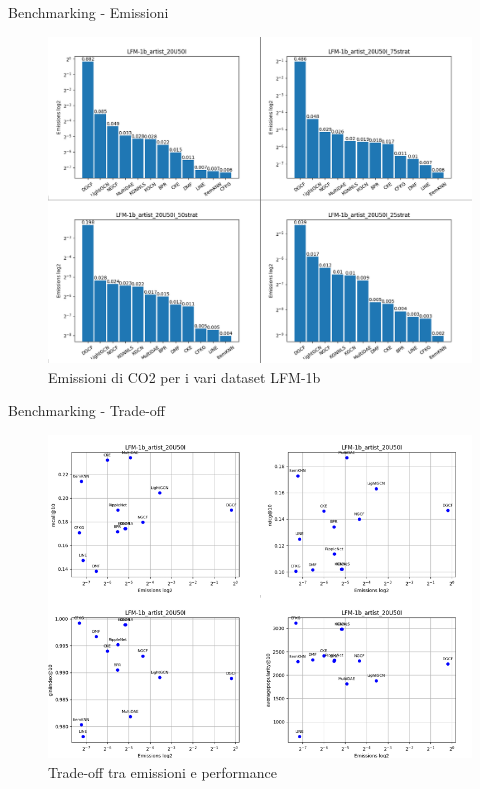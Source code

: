 \begin{frame}{Benchmarking - Emissioni}
    \vspace{-0.9cm}
    \begin{figure}[H]
        \centering
        \includegraphics[width=\linewidth,height=0.85\textheight,keepaspectratio]{images/EmissioniLFM.png}
        \caption{Emissioni di CO2 per i vari dataset LFM-1b}
        \label{tab:emissions_info}
    \end{figure}
\end{frame}

\begin{frame}{Benchmarking - Trade-off}
    \vspace{-0.9cm}
    \begin{figure}[H]
    \centering
    \includegraphics[width=\linewidth,height=0.85\textheight,keepaspectratio]{images/TradeOff.png}
    \caption{Trade-off tra emissioni e performance}
    \end{figure}
\end{frame}
